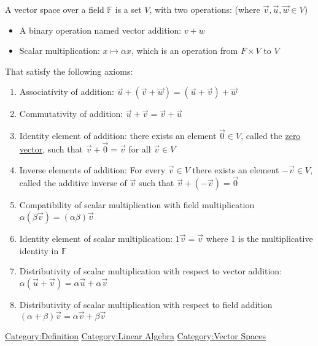 A vector space over a field \(\mathbb{F}\) is a set \(V\), with two
operations: (where \(\vec{v}, \vec{u}, \vec{w} \in V\))

\begin{itemize}
\tightlist
\item
  A binary operation named vector addition: \(v + w\)
\item
  Scalar multiplication: \(x \mapsto \alpha x\), which is an operation
  from \(F\times V\) to \(V\)
\end{itemize}

That satisfy the following axioms:

\begin{enumerate}
\tightlist
\item
  Associativity of addition:
  \(\vec{u}  + \left( \vec{v}  + \vec{w}  \right) = \left( \vec{u}  + \vec{v}  \right)  + \vec{w}\)
\item
  Commutativity of addition: \(\vec{u}  + \vec{v} = \vec{v}  + \vec{u}\)
\item
  Identity element of addition: there exists an element
  \(\vec{0} \in  V\), called the \href{Zero_n-Tuple}{zero vector}, such
  that \(\vec{v}  + \vec{0} = \vec{v}\) for all \(\vec{v}  \in  V\)
\item
  Inverse elements of addition: For every \(\vec{v} \in  V\) there
  exists an element \(- \vec{v}  \in  V\), called the additive inverse
  of \(\vec{v}\) such that
  \(\vec{v}  + \left(  - \vec{v}  \right) = \vec{0}\)
\item
  Compatibility of scalar multiplication with field multiplication
  \(\alpha \left( \beta \vec{v}  \right) = \left( \alpha \beta  \right) \vec{v}\)
\item
  Identity element of scalar multiplication: \(1\vec{v} = \vec{v}\)
  where 1 is the multiplicative identity in \(\mathbb{F}\)
\item
  Distributivity of scalar multiplication with respect to vector
  addition:
  \(\alpha \left( \vec{u}  + \vec{v}  \right) = \alpha \vec{u}  + \alpha \vec{v}\)
\item
  Distributivity of scalar multiplication with respect to field addition
  \(\left( \alpha  + \beta  \right) \vec{v} = \alpha \vec{v}  + \beta \vec{v}\)
\end{enumerate}

\url{Category:Definition} \href{Category:Linear_Algebra}{Category:Linear
Algebra} \href{Category:Vector_Spaces}{Category:Vector Spaces}
